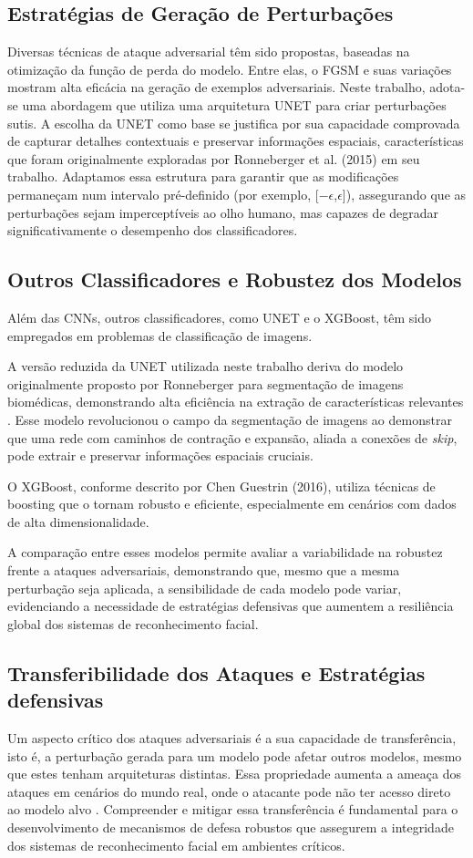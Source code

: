 \documentclass[12pt]{article}
\begin{document}
\subsection{Estratégias de Geração de Perturbações}
Diversas técnicas de ataque adversarial têm sido propostas, baseadas na
otimização da função de perda do modelo. Entre elas, o FGSM e suas variações
mostram alta eficácia na geração de exemplos adversariais. Neste trabalho,
adota-se uma abordagem que utiliza uma arquitetura UNET para criar perturbações
sutis. A escolha da UNET como base se justifica por sua capacidade comprovada
de capturar detalhes contextuais e preservar informações espaciais,
características que foram originalmente exploradas por Ronneberger et al.
(2015) em seu trabalho. Adaptamos essa estrutura para garantir que as
modificações permaneçam num intervalo pré-definido (por exemplo,
[$-\epsilon$,$\epsilon$]), assegurando que as perturbações sejam imperceptíveis
ao olho humano, mas capazes de degradar significativamente o desempenho dos
classificadores.

\subsection{Outros Classificadores e Robustez dos Modelos}
Além das CNNs, outros classificadores, como UNET e o XGBoost, têm sido
empregados em problemas de classificação de imagens.

A versão reduzida da UNET utilizada neste trabalho deriva do modelo
originalmente proposto por Ronneberger para segmentação de imagens biomédicas,
demonstrando alta eficiência na extração de características relevantes
\cite{ronneberger2015u}. Esse modelo revolucionou o campo da segmentação de
imagens ao demonstrar que uma rede com caminhos de contração e expansão, aliada
a conexões de \textit{skip}, pode extrair e preservar informações espaciais
cruciais.

O XGBoost, conforme descrito por Chen Guestrin (2016), utiliza técnicas de
boosting que o tornam robusto e eficiente, especialmente em cenários com dados
de alta dimensionalidade.

A comparação entre esses modelos permite avaliar a variabilidade na robustez
frente a ataques adversariais, demonstrando que, mesmo que a mesma perturbação
seja aplicada, a sensibilidade de cada modelo pode variar, evidenciando a
necessidade de estratégias defensivas que aumentem a resiliência global dos
sistemas de reconhecimento facial.

\subsection{Transferibilidade dos Ataques e Estratégias defensivas}
Um aspecto crítico dos ataques adversariais é a sua capacidade de
transferência, isto é, a perturbação gerada para um modelo pode afetar outros
modelos, mesmo que estes tenham arquiteturas distintas. Essa propriedade
aumenta a ameaça dos ataques em cenários do mundo real, onde o atacante pode
não ter acesso direto ao modelo alvo \cite{tramer2021}. Compreender e mitigar
essa transferência é fundamental para o desenvolvimento de mecanismos de defesa
robustos que assegurem a integridade dos sistemas de reconhecimento facial em
ambientes críticos.
\end{document}
